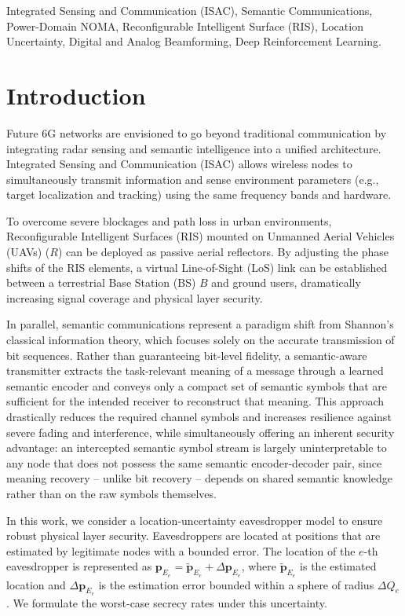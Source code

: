 \documentclass[journal,onecolumn]{IEEEtran}
\begin{document}
\begin{IEEEkeywords}
Integrated Sensing and Communication (ISAC), Semantic Communications, Power-Domain NOMA, Reconfigurable Intelligent Surface (RIS), Location Uncertainty, Digital and Analog Beamforming, Deep Reinforcement Learning.
\end{IEEEkeywords}

\IEEEpeerreviewmaketitle

\section{Introduction}
Future 6G networks are envisioned to go beyond traditional communication by integrating radar sensing and semantic intelligence into a unified architecture. Integrated Sensing and Communication (ISAC) allows wireless nodes to simultaneously transmit information and sense environment parameters (e.g., target localization and tracking) using the same frequency bands and hardware.

To overcome severe blockages and path loss in urban environments, Reconfigurable Intelligent Surfaces (RIS) mounted on Unmanned Aerial Vehicles (UAVs) ($R$) can be deployed as passive aerial reflectors. By adjusting the phase shifts of the RIS elements, a virtual Line-of-Sight (LoS) link can be established between a terrestrial Base Station (BS) $B$ and ground users, dramatically increasing signal coverage and physical layer security.

In parallel, semantic communications represent a paradigm shift from Shannon's classical information theory, which focuses solely on the accurate transmission of bit sequences. Rather than guaranteeing bit-level fidelity, a semantic-aware transmitter extracts the task-relevant meaning of a message through a learned semantic encoder and conveys only a compact set of semantic symbols that are sufficient for the intended receiver to reconstruct that meaning. This approach drastically reduces the required channel symbols and increases resilience against severe fading and interference, while simultaneously offering an inherent security advantage: an intercepted semantic symbol stream is largely uninterpretable to any node that does not possess the same semantic encoder-decoder pair, since meaning recovery -- unlike bit recovery -- depends on shared semantic knowledge rather than on the raw symbols themselves.

In this work, we consider a location-uncertainty eavesdropper model to ensure robust physical layer security. Eavesdroppers are located at positions that are estimated by legitimate nodes with a bounded error. The location of the $e$-th eavesdropper is represented as $\mathbf{p}_{E_e} = \widetilde{\mathbf{p}}_{E_e} + \Delta\mathbf{p}_{E_e}$, where $\widetilde{\mathbf{p}}_{E_e}$ is the estimated location and $\Delta\mathbf{p}_{E_e}$ is the estimation error bounded within a sphere of radius $\Delta Q_e$. We formulate the worst-case secrecy rates under this uncertainty.
\end{document}
